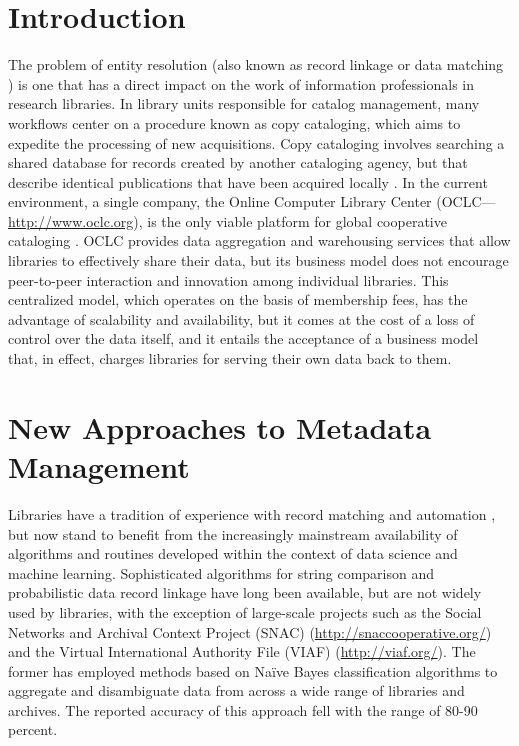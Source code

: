 \documentclass[sigconf]{acmart}
\begin{document}
\section{Introduction}
The problem of entity resolution (also known as record linkage or data matching \cite{pC12}) is one that has a direct impact on the work of information professionals in research libraries. In library units responsible for catalog management, many workflows center on a procedure known as copy cataloging, which aims to expedite the processing of new acquisitions. Copy cataloging involves searching a shared database for records created by another cataloging agency, but that describe identical publications that have been acquired locally \cite{cD17}. In the current environment, a single company, the Online Computer Library Center (OCLC---\url{http://www.oclc.org}), is the only viable platform for global cooperative cataloging \cite{aT10}. OCLC provides data aggregation and warehousing services that allow libraries to effectively share their data, but its business model does not encourage peer-to-peer interaction and innovation among individual libraries. This centralized model, which operates on the basis of membership fees, has the advantage of scalability and availability, but it comes at the cost of a loss of control over the data itself, and it entails the acceptance of a business model that, in effect, charges libraries for serving their own data back to them.

\section{New Approaches to Metadata Management}
Libraries have a tradition of experience with record matching and automation \cite{jM92}, but now stand to benefit from the increasingly mainstream availability of algorithms and routines developed within the context of data science and machine learning. Sophisticated algorithms for string comparison and probabilistic data record linkage have long been available, but are not widely used by libraries, with the exception of large-scale projects such as the Social Networks and Archival Context Project (SNAC) (\url{http://snaccooperative.org/}) and the Virtual International Authority File (VIAF) (\url{http://viaf.org/}). The former has employed methods based on Na{\"i}ve Bayes classification algorithms to aggregate and disambiguate data from across a wide range of libraries and archives. The reported accuracy of this approach fell with the range of 80-90 percent.
\end{document}
